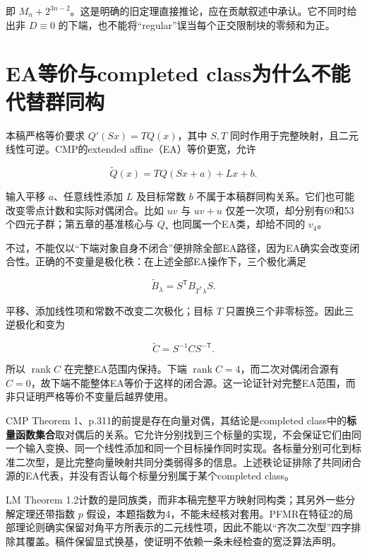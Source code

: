 \documentclass[UTF8,fontset=fandol,zihao=-4,openany,oneside]{ctexbook}
\begin{document}
即 \(M_n+2^{3n-2}\)。这是明确的旧定理直接推论，应在贡献叙述中承认。它不同时给出非 \(D\equiv0\) 的下端，也不能将“regular”误当每个正交限制块的零频和为正。



\section{EA等价与completed class为什么不能代替群同构}


本稿严格等价要求 \(Q'(Sx)=TQ(x)\)，其中 \(S,T\) 同时作用于完整映射，且二元线性可逆。CMP的extended affine（EA）等价更宽，允许



\[
\widetilde Q(x)=TQ(Sx+a)+Lx+b.
\]



输入平移 \(a\)、任意线性添加 \(L\) 及目标常数 \(b\) 不属于本稿群同构关系。它们也可能改变零点计数和实际对偶闭合。比如 \(uv\) 与 \(uv+u\) 仅差一次项，却分别有69和53个四元子群；第五章的基准核心与 \(Q_*\) 也同属一个EA类，却给不同的 \(v_4\)。



不过，不能仅以“下端对象自身不闭合”便排除全部EA路径，因为EA确实会改变闭合性。正确的不变量是极化秩：在上述全部EA操作下，三个极化满足



\[
\widetilde B_\lambda=S^{\mathsf T}B_{T^*\lambda}S.
\]



平移、添加线性项和常数不改变二次极化；目标 \(T\) 只置换三个非零标签。因此三逆极化和变为



\[
\widetilde C=S^{-1}CS^{-\mathsf T}.
\]



所以 \(\operatorname{rank}C\) 在完整EA范围内保持。下端 \(\operatorname{rank}C=4\)，而二次对偶闭合源有 \(C=0\)，故下端不能整体EA等价于这样的闭合源。这一论证针对完整EA范围，而非只证明严格等价不变量后越界使用。



CMP Theorem 1、p.311的前提是存在向量对偶，其结论是completed class中的\textbf{标量函数集合}取对偶后的关系。它允许分别找到三个标量的实现，不会保证它们由同一个输入变换、同一个线性添加和同一个目标操作同时实现。各标量分别可化到标准二次型，是比完整向量映射共同分类弱得多的信息。上述秩论证排除了共同闭合源的EA代表，并没有否认每个标量分别属于某个completed class。



LM Theorem 1.2计数的是同族类，而非本稿完整平方映射同构类；其另外一些分解定理还带指数 \(p\) 假设，本题指数为4，不能未经核对套用。PFMR在特征2的局部理论则确实保留对角平方所表示的二元线性项，因此不能以“齐次二次型”四字排除其覆盖。稿件保留显式换基，使证明不依赖一条未经检查的宽泛算法声明。
\end{document}
